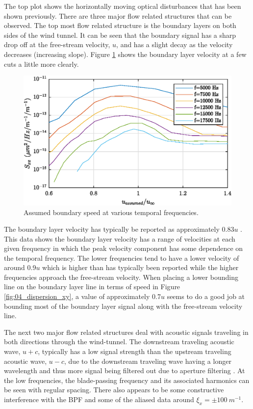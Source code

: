 The top plot shows the horizontally moving optical disturbances that has been shown previously.
There are three major flow related structures that can be observed.
The top most flow related structure is the boundary layers on both sides of the wind tunnel.
It can be seen that the boundary signal has a sharp drop off at the free-stream velocity, $u$, and has a slight decay as the velocity decreases (increasing slope).
Figure \ref{fig:04_dispersion_speed} shows the boundary layer velocity at a few cuts a little more clearly.
\begin{figure}
  \centering
  \includegraphics{../matlab/04_dispersion_analysis/dispersion_speed.eps}
  \caption{Assumed boundary speed at various temporal frequencies.}
  \label{fig:04_dispersion_speed}
\end{figure}
The boundary layer velocity has typically be reported as approximately 0.83$u$ \cite{Gordeyev-2014-jcJndkHM}.
This data shows the boundary layer velocity has a range of velocities at each given frequency in which the peak velocity component has some dependence on the temporal frequency.
The lower frequencies tend to have a lower velocity of around 0.9$u$ which is higher than has typically been reported while the higher frequencies approach the free-stream velocity.
When placing a lower bounding line on the boundary layer line in terms of speed in Figure \ref{fig:04_dispersion_xy}, a value of approximately 0.7$u$ seems to do a good job at bounding most of the boundary layer signal along with the free-stream velocity line.

The next two major flow related structures deal with acoustic signals traveling in both directions through the wind-tunnel.
The downstream traveling acoustic wave, $u+c$, typically has a low signal strength than the upstream traveling acoustic wave, $u-c$, due to the downstream traveling wave having a longer wavelength and thus more signal being filtered out due to aperture filtering \cite{Siegenthaler-2008-9Yutbt6c}.
At the low frequencies, the blade-passing frequency and its associated harmonics can be seen with regular spacing.
There also appears to be some constructive interference with the BPF and some of the aliased data around $\xi_x = \pm100\ m^{-1}$.

